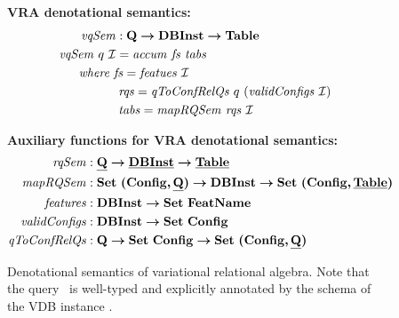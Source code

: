 \begin{figure}

\textbf{VRA denotational semantics:}
\begin{alignat*}{1}
\mathit{vqSem} &: \qSet \totype \vdbInstSet \totype \tabletype\\
\mathit{vqSem} \  \vQ \ \vdbInst &= \mathit{accum} \ \mathit{fs} \ \mathit{tabs}\\
&\hspace{-30pt}\textit{where } \mathit{fs} =\mathit{featues} \ \vdbInst\\
&\hspace{2pt} \mathit{rqs} = \mathit{qToConfRelQs} \ \vQ \ (\mathit{validConfigs} \ \vdbInst)\\
&\hspace{2pt} \mathit{tabs} = \mathit{mapRQSem} \ \mathit{rqs} \ \vdbInst
\end{alignat*}


\medskip 
\textbf{Auxiliary functions for VRA denotational semantics:}
\begin{alignat*}{1}
\mathit{rqSem} &: \pQSet \totype \pInstSet \totype \pTabSet\\
\mathit{mapRQSem} &: \settype {\typepair \confSet \pQSet} \totype \vdbInstSet \totype \settype {\typepair \confSet \pTabSet}\\
\mathit{features} &: \vdbInstSet \totype \settype \fSet\\
\mathit{validConfigs} &: \vdbInstSet \totype \settype \confSet\\
\mathit{qToConfRelQs} &: \qSet \totype \settype \confSet \totype \settype {\typepair \confSet \pQSet}\\
\end{alignat*}


\caption[VRA denotational semantics]{Denotational semantics of variational relational algebra.
Note that the query \vQ\ is well-typed and explicitly annotated by the schema of the VDB instance \vdbInst.
}
\label{fig:densem}
\end{figure}

